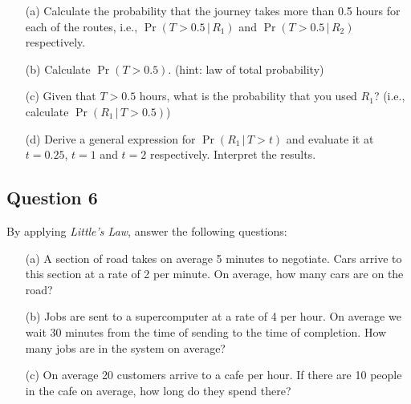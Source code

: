 \documentclass[]{report}
\begin{document}
\begin{itemize}
\item[(a)] Calculate the probability that the journey takes more than 0.5 hours for each of the routes, i.e., $\Pr(T > 0.5\,|\,R_1)$ and $\Pr(T > 0.5\,|\,R_2)$ respectively.  \item[(b)] Calculate $\Pr(T > 0.5)$. (hint: law of total probability)  \item[(c)] Given that $T>0.5$ hours, what is the probability that you used $R_1$? (i.e., calculate $\Pr(R_1\,|\,T>0.5)$)  \item[(d)] Derive a general expression for $\Pr(R_1\,|\,T>t)$ and evaluate it at $t=0.25$, $t = 1$ and $t = 2$ respectively. Interpret the results.
\end{itemize}





\subsection*{Question 6}
By applying \emph{Little's Law}, answer the following questions:\\[-0.2cm]
\begin{itemize}
\item[(a)] A section of road takes on average 5 minutes to negotiate. Cars arrive to this section at a rate of 2 per minute. On average, how many cars are on the road?   \item[(b)] Jobs are sent to a supercomputer at a rate of 4 per hour. On average we wait 30 minutes from the time of sending to the time of completion. How many jobs are in the system on average?  \item[(c)] On average 20 customers arrive to a cafe per hour. If there are 10 people in the cafe on average, how long do they spend there?
\end{itemize}
\end{document}
